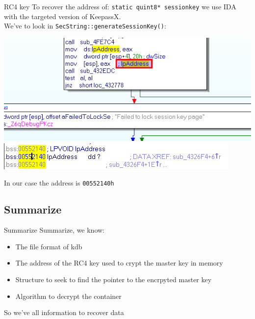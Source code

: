 \documentclass[compress]{beamer}
\begin{document}
\begin{frame}[fragile]{RC4 key}
  To recover the address of: \verb|static quint8* sessionkey| we use IDA with the targeted version of KeepassX.\\
  We've to look in \verb|SecString::generateSessionKey()|:\\
  \vspace{0.1in}
  \begin{center}
  \includegraphics[scale=0.4]{img/keypass_ida_session}\\
  \vspace{0.1in}
  \includegraphics[scale=0.4]{img/keypass_ida_session_adr}\\
  \end{center}
  \vspace{0.1in}
  In our case the address is \verb|00552140h|\\
\end{frame}

\subsection{Summarize}
\begin{frame}[fragile]{Summarize}
  Summarize, we know:
  \begin{itemize}
    \item The file format of kdb
    \item The address of the RC4 key used to crypt the master key in memory
    \item Structure to seek to find the pointer to the encrpyted master key
    \item Algorithm to decrypt the container
  \end{itemize}
  \vspace{0.2in}
  So we've all information to recover data
\end{frame}
\end{document}
